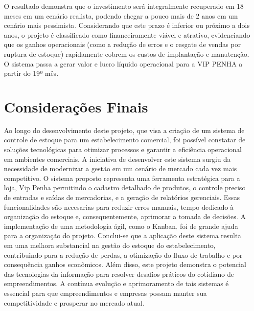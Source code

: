 \documentclass[
	12pt,				%
	openany,			%
	twoside,			%
	a4paper,			%
	english,			%
	brazil				%
	]{abntex2}
\begin{document}
\FloatBarrier

O resultado demonstra que o investimento será integralmente recuperado em 18 meses em um cenário realista, podendo chegar a pouco mais de 2 anos em um cenário mais pessimista. Considerando que este prazo é inferior ou próximo a dois anos, o projeto é classificado como financeiramente viável e atrativo, evidenciando que os ganhos operacionais (como a redução de erros e o resgate de vendas por ruptura de estoque) rapidamente cobrem os custos de implantação e manutenção. O sistema passa a gerar valor e lucro líquido operacional para a VIP PENHA a partir do 19º mês.


\chapter{Considerações Finais}
Ao longo do desenvolvimento deste projeto, que visa a criação de um sistema de controle de estoque para um estabelecimento comercial, foi possível constatar de soluções tecnológicas para otimizar processos e garantir a eficiência operacional em ambientes comerciais. A iniciativa de desenvolver este sistema surgiu da necessidade de modernizar a gestão  em um cenário de mercado cada vez mais competitivo.
O sistema proposto representa uma ferramenta estratégica para a loja, Vip Penha permitindo o cadastro detalhado de produtos, o controle preciso de entradas e saídas de mercadorias, e a geração de relatórios gerenciais. Essas funcionalidades são necesarias para reduzir erros manuais, tempo dedicado à organização do estoque e, consequentemente, aprimorar a tomada de decisões. A implementação de uma metodologia ágil, como o Kanban, foi de grande ajuda para a organização do projeto.
Conclui-se que a aplicação deste sistema resulta em uma melhora substancial na gestão do estoque do estabelecimento, contribuindo para a redução de perdas, a otimização do fluxo de trabalho e por consequência ganhos econômicos. Além disso, este projeto demonstra o potencial das tecnologias da informação para resolver desafios práticos do cotidiano de empreendimentos. A contínua evolução e aprimoramento de tais sistemas é essencial para que empreendimentos e empresas   possam manter sua competitividade e prosperar no mercado atual.
\end{document}

